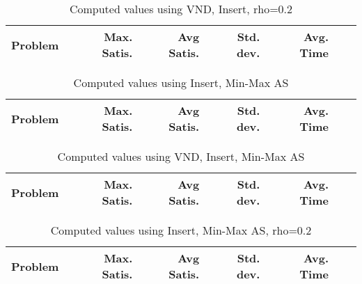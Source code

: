\documentclass{article}
\begin{document}
\begin{table}
  \vspace{-6mm}%
  \caption{Computed values using VND, Insert, rho=0.2}
  \label{tab:conf11}
  \setlength{\tabcolsep}{1.4mm}
  \centering
  \begin{tabular}{lrrrrrr}
    \bfseries Problem &
    \bfseries Max. Satis. &
    \bfseries Avg Satis. &
    \bfseries Std. dev. &
    \bfseries Avg. Time 
    \\\hline
    
    \hline
  \end{tabular}

\end{table}

\clearpage

\begin{table}
  \vspace{-6mm}%
  \caption{Computed values using Insert, Min-Max AS}
  \label{tab:conf12}
  \setlength{\tabcolsep}{1.4mm}
  \centering
  \begin{tabular}{lrrrrrr}
    \bfseries Problem &
    \bfseries Max. Satis. &
    \bfseries Avg Satis. &
    \bfseries Std. dev. &
    \bfseries Avg. Time 
    \\\hline
    
    \hline
  \end{tabular}

\end{table}


\begin{table}
  \vspace{-6mm}%
  \caption{Computed values using VND, Insert, Min-Max AS}
  \label{tab:conf13}
  \setlength{\tabcolsep}{1.4mm}
  \centering
  \begin{tabular}{lrrrrrr}
    \bfseries Problem &
    \bfseries Max. Satis. &
    \bfseries Avg Satis. &
    \bfseries Std. dev. &
    \bfseries Avg. Time 
    \\\hline
    
    \hline
  \end{tabular}

\end{table}


\begin{table}
  \vspace{-6mm}%
  \caption{Computed values using Insert, Min-Max AS, rho=0.2}
  \label{tab:conf14}
  \setlength{\tabcolsep}{1.4mm}
  \centering
  \begin{tabular}{lrrrrrr}
    \bfseries Problem &
    \bfseries Max. Satis. &
    \bfseries Avg Satis. &
    \bfseries Std. dev. &
    \bfseries Avg. Time 
    \\\hline
    
    \hline
  \end{tabular}

\end{table}
\end{document}
